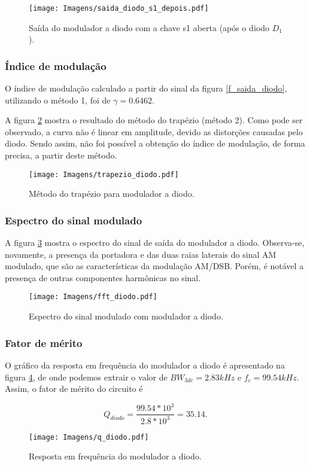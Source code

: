 \begin{figure}[H]
    \centering
    \caption{Saída do modulador a diodo com a chave s1 aberta (após o diodo $D_1$).}
    \texttt{[image: Imagens/saida\_diodo\_s1\_depois.pdf]}
    \label{f_saida_diodo_s1_depois}
\end{figure}

\subsubsection{Índice de modulação}
O índice de modulação calculado a partir do sinal da figura \ref{f_saida_diodo}, utilizando o método 1, foi de $\gamma = 0.6462$.

A figura \ref{f_trapezio_diodo} mostra o resultado do método do trapézio (método 2). Como pode ser observado, a curva não é linear em amplitude, devido as distorções causadas pelo diodo. Sendo assim, não foi possível a obtenção do índice de modulação, de forma precisa, a partir deste método.

\begin{figure}[H]
    \centering
    \caption{Método do trapézio para modulador a diodo.}
    \texttt{[image: Imagens/trapezio\_diodo.pdf]}
    \label{f_trapezio_diodo}
\end{figure}

\subsubsection{Espectro do sinal modulado}
A figura \ref{f_fft_diodo} mostra o espectro do sinal de saída do modulador a diodo. Observa-se, novamente, a presença da portadora e das duas raias laterais do sinal AM modulado, que são as características da modulação AM/DSB. Porém, é notável a presença de outras componentes harmônicas no sinal.

\begin{figure}[H]
    \centering
    \caption{Espectro do sinal modulado com modulador a diodo.}
    \texttt{[image: Imagens/fft\_diodo.pdf]}
    \label{f_fft_diodo}
\end{figure}

\subsubsection{Fator de mérito}
O gráfico da resposta em frequência do modulador a diodo é apresentado na figura \ref{f_q_diodo}, de onde podemos extrair o valor de $BW_{3dc} = 2.83 kHz$ e $f_c = 99.54 kHz$. Assim, o fator de mérito do circuito é

\[
Q_{diodo} = \frac{99.54*10^3}{2.8*10^3} = 35.14. 
\]


\begin{figure}[H]
    \centering
    \caption{Resposta em frequência do modulador a diodo.}
    \texttt{[image: Imagens/q\_diodo.pdf]}
    \label{f_q_diodo}
\end{figure}


